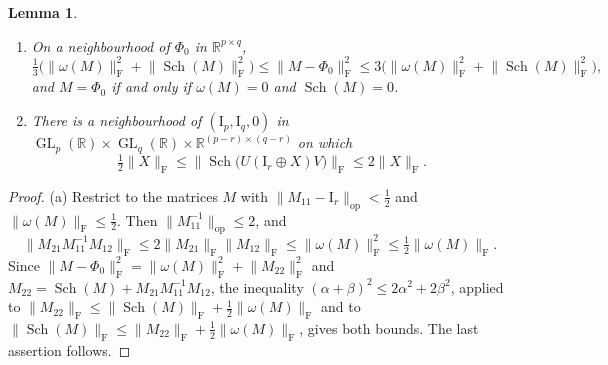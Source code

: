 \documentclass[11pt,a4paper]{article}
\newtheorem{lemma}[theorem]{Lemma}
\theoremstyle{definition}
\theoremstyle{remark}
\numberwithin{equation}{section}
\newcommand{\R}{\mathbb{R}}
\newcommand{\GL}{\operatorname{GL}}
\newcommand{\Sch}{\operatorname{Sch}}
\newcommand{\id}{\mathrm{I}}
\newcommand{\Fr}[1]{\lVert #1\rVert_{\mathrm F}}
\newcommand{\norm}[1]{\lVert #1\rVert}
\begin{document}
\begin{lemma}\label{lem:schur}
\begin{enumerate}[label=\textup{(\alph*)}]
\item On a neighbourhood of $\Phi_0$ in $\R^{p\times q}$,
\[
\tfrac13\bigl(\Fr{\omega(M)}^2+\Fr{\Sch(M)}^2\bigr)\le\Fr{M-\Phi_0}^2\le3\bigl(\Fr{\omega(M)}^2+\Fr{\Sch(M)}^2\bigr),
\]
and $M=\Phi_0$ if and only if $\omega(M)=0$ and $\Sch(M)=0$.
\item There is a neighbourhood of $(\id_p,\id_q,0)$ in $\GL_p(\R)\times\GL_q(\R)\times\R^{(p-r)\times(q-r)}$ on which
\[
\tfrac12\Fr X\le\Fr{\Sch\bigl(U(\id_r\oplus X)V\bigr)}\le2\Fr X .
\]
\end{enumerate}
\end{lemma}
\begin{proof}
(a) Restrict to the matrices $M$ with $\norm{M_{11}-\id_r}_{\mathrm{op}}<\frac12$ and $\Fr{\omega(M)}\le\frac12$. Then $\norm{M_{11}^{-1}}_{\mathrm{op}}\le2$, and
\[
\Fr{M_{21}M_{11}^{-1}M_{12}}\le2\Fr{M_{21}}\Fr{M_{12}}\le\Fr{\omega(M)}^2\le\tfrac12\Fr{\omega(M)}.
\]
Since $\Fr{M-\Phi_0}^2=\Fr{\omega(M)}^2+\Fr{M_{22}}^2$ and $M_{22}=\Sch(M)+M_{21}M_{11}^{-1}M_{12}$, the inequality $(\alpha+\beta)^2\le2\alpha^2+2\beta^2$, applied to $\Fr{M_{22}}\le\Fr{\Sch(M)}+\frac12\Fr{\omega(M)}$ and to $\Fr{\Sch(M)}\le\Fr{M_{22}}+\frac12\Fr{\omega(M)}$, gives both bounds. The last assertion follows.


\end{proof}
\end{document}
